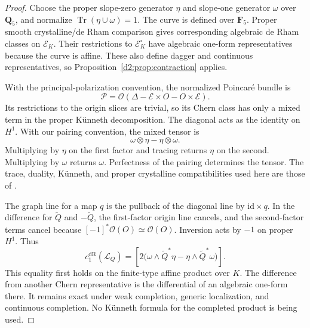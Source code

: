 \documentclass[11pt,a4paper]{amsart}
\numberwithin{equation}{section}
\theoremstyle{definition}
\theoremstyle{remark}
\newcommand{\DtwoQQ}{\mathbf{Q}}
\newcommand{\DtwoFF}{\mathbf{F}}
\newcommand{\DtwocO}{\mathcal O}
\newcommand{\DtwocE}{\mathcal E}
\newcommand{\DtwocP}{\mathcal P}
\newcommand{\DtwocL}{\mathcal L}
\newcommand{\Dtwowt}{\widetilde}
\newcommand{\DtwodR}{\mathrm{dR}}
\newcommand{\Dtwoid}{\mathrm{id}}
\DeclareMathOperator{\DtwoTr}{Tr}
\begin{document}
\begin{proof}
Choose the proper slope-zero generator \(\eta\) and slope-one
generator \(\omega\) over \(\DtwoQQ_5\), and normalize
\(\DtwoTr(\eta\cup\omega)=1\).
The curve is defined over \(\DtwoFF_5\).
Proper smooth crystalline/de Rham comparison gives corresponding
algebraic de Rham classes on \(\DtwocE_K\).
Their restrictions to \(\DtwocE_K^\circ\) have algebraic one-form
representatives because the curve is affine.
These also define dagger and continuous representatives, so
Proposition~\ref{d2:prop:contraction} applies.

With the principal-polarization convention, the normalized
Poincar\'e bundle is
\[
 \DtwocP=\DtwocO(\Delta-\DtwocE\times O-O\times\DtwocE).
\]
Its restrictions to the origin slices are trivial, so its Chern
class has only a mixed term in the proper K\"unneth decomposition.
The diagonal acts as the identity on \(H^1\).
With our pairing convention, the mixed tensor is
\[
 \omega\otimes\eta-\eta\otimes\omega.
\]
Multiplying by \(\eta\) on the first factor and tracing returns
\(\eta\) on the second. Multiplying by \(\omega\) returns
\(\omega\). Perfectness of the pairing determines the tensor.
The trace, duality, K\"unneth, and proper crystalline compatibilities
used here are those of \cite[\S1.7(i), \S2.3(i), Theorems~2.4 and~3.2, and \S3.3(i)]{Berthelot1997Duality}.

The graph line for a map \(q\) is the pullback of the diagonal line
by \(\Dtwoid\times q\).
In the difference for \(\Dtwowt Q\) and \(-\Dtwowt Q\), the first-factor
origin line cancels, and the second-factor terms cancel because
\([-1]^*\DtwocO(O)\simeq\DtwocO(O)\).
Inversion acts by \(-1\) on proper \(H^1\).
Thus
\begin{equation}\label{d2:eq:graph-class}
 c_1^\DtwodR(\DtwocL_Q)
 =
 \left[2\bigl(\omega\wedge\Dtwowt Q^*\eta
             -\eta\wedge\Dtwowt Q^*\omega\bigr)\right].
\end{equation}
This equality first holds on the finite-type affine product over
\(K\). The difference from another Chern representative is the
differential of an algebraic one-form there.
It remains exact under weak completion, generic localization, and
continuous completion. No K\"unneth formula for the completed
product is being used.


\end{proof}
\end{document}
